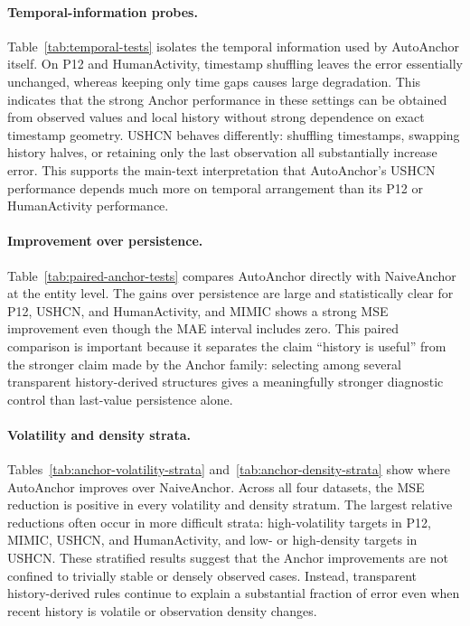 \documentclass{article}
\newcommand{\method}{AutoAnchor}
\begin{document}
\paragraph{Temporal-information probes.}
Table~\ref{tab:temporal-tests} isolates the temporal information used by
\method{} itself. On P12 and HumanActivity, timestamp shuffling leaves the error
essentially unchanged, whereas keeping only time gaps causes large degradation.
This indicates that the strong Anchor performance in these settings can be
obtained from observed values and local history without strong dependence on
exact timestamp geometry. USHCN behaves differently: shuffling timestamps,
swapping history halves, or retaining only the last observation all substantially
increase error. This supports the main-text interpretation that AutoAnchor's
USHCN performance depends much more on temporal arrangement than its P12 or
HumanActivity performance.

\paragraph{Improvement over persistence.}
Table~\ref{tab:paired-anchor-tests} compares \method{} directly with
NaiveAnchor at the entity level. The gains over persistence are large and
statistically clear for P12, USHCN, and HumanActivity, and MIMIC shows a strong
MSE improvement even though the MAE interval includes zero. This paired
comparison is important because it separates the claim ``history is useful''
from the stronger claim made by the Anchor family: selecting among several
transparent history-derived structures gives a meaningfully stronger diagnostic
control than last-value persistence alone.

\paragraph{Volatility and density strata.}
Tables~\ref{tab:anchor-volatility-strata} and~\ref{tab:anchor-density-strata}
show where \method{} improves over NaiveAnchor. Across all four datasets, the
MSE reduction is positive in every volatility and density stratum. The largest
relative reductions often occur in more difficult strata: high-volatility
targets in P12, MIMIC, USHCN, and HumanActivity, and low- or high-density
targets in USHCN. These stratified results suggest that the Anchor improvements
are not confined to trivially stable or densely observed cases. Instead,
transparent history-derived rules continue to explain a substantial fraction of
error even when recent history is volatile or observation density changes.
\end{document}
